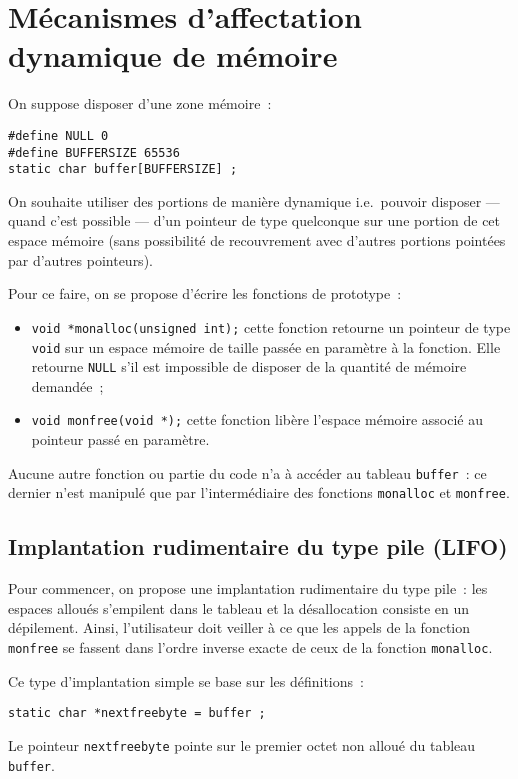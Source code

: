 \section{M\'ecanismes d'affectation dynamique de m\'emoire}
\label{sec:AffectationMemoire}
On suppose disposer d'une zone m\'emoire~:
\begin{verbatim}
#define NULL 0
#define BUFFERSIZE 65536
static char buffer[BUFFERSIZE] ;
\end{verbatim}
On souhaite utiliser des portions de mani\`ere dynamique i.e.\ pouvoir
disposer --- quand c'est possible --- d'un pointeur de type quelconque
sur une portion de cet espace m\'emoire (sans possibilit\'e de
recouvrement avec d'autres portions point\'ees par d'autres
pointeurs).

Pour ce faire, on se propose d'\'ecrire les fonctions de prototype~:
\begin{itemize}
\item \verb+void *monalloc(unsigned int);+ cette fonction retourne un
  pointeur de type \verb+void+ sur un espace m\'emoire de taille
  pass\'ee en param\`etre \`a la fonction. Elle retourne \verb+NULL+
  s'il est impossible de disposer de la quantit\'e de m\'emoire
  demand\'ee~;
\item \verb+void monfree(void *);+ cette fonction lib\`ere l'espace
  m\'emoire associ\'e au pointeur pass\'e en param\`etre.
\end{itemize}
Aucune autre fonction ou partie du code n'a \`a acc\'eder au tableau
\verb+buffer+~: ce dernier n'est manipul\'e que par l'interm\'ediaire
des fonctions \verb+monalloc+ et \verb+monfree+. 

\subsection{Implantation rudimentaire du type pile (LIFO)}
Pour commencer, on propose une implantation rudimentaire du type
pile~: les espaces allou\'es s'empilent dans le tableau et la
d\'esallocation consiste en un d\'epilement. Ainsi, l'utilisateur doit
veiller \`a ce que les appels de la fonction \verb+monfree+ se fassent
dans l'ordre inverse exacte de ceux de la fonction \verb+monalloc+.

Ce type d'implantation simple se base sur les d\'efinitions~:
\begin{verbatim}
static char *nextfreebyte = buffer ;
\end{verbatim}
Le pointeur \verb+nextfreebyte+ pointe sur le premier octet non
allou\'e du tableau \verb+buffer+.

